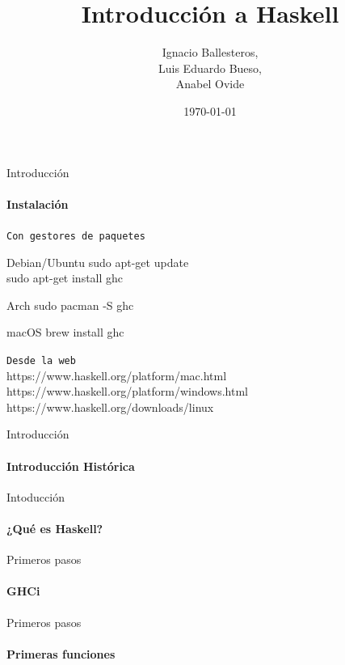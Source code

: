 \documentclass{beamer}
\title{Introducción a Haskell}
\subtitle{}
\date{\today}
\author{Ignacio Ballesteros,\\Luis Eduardo Bueso,\\Anabel Ovide}
\institute{\url{https://github.com/edububa/haskell_course}}
\begin{document}
\maketitle

\begin{frame}{Introducción}
  \framesubtitle{Instalación}

  \texttt{Con gestores de paquetes}

  \begin{block}{Debian/Ubuntu}
    sudo apt-get update\\
    sudo apt-get install ghc
  \end{block}

  \begin{block}{Arch}
    sudo pacman -S ghc
  \end{block}

  \begin{block}{macOS}
    brew install ghc
  \end{block}

  \texttt{Desde la web}\\
  https://www.haskell.org/platform/mac.html\\
  https://www.haskell.org/platform/windows.html\\
  https://www.haskell.org/downloads/linux

\end{frame}

\begin{frame}{Introducción}     %
  \framesubtitle{Introducción Histórica}

\end{frame}

\begin{frame}{Intoducción}      %
  \framesubtitle{¿Qué es Haskell?}

\end{frame}

\begin{frame}{Primeros pasos}      %
  \framesubtitle{GHCi}

\end{frame}

\begin{frame}{Primeros pasos}      %
  \framesubtitle{Primeras funciones}

\end{frame}
\end{document}

